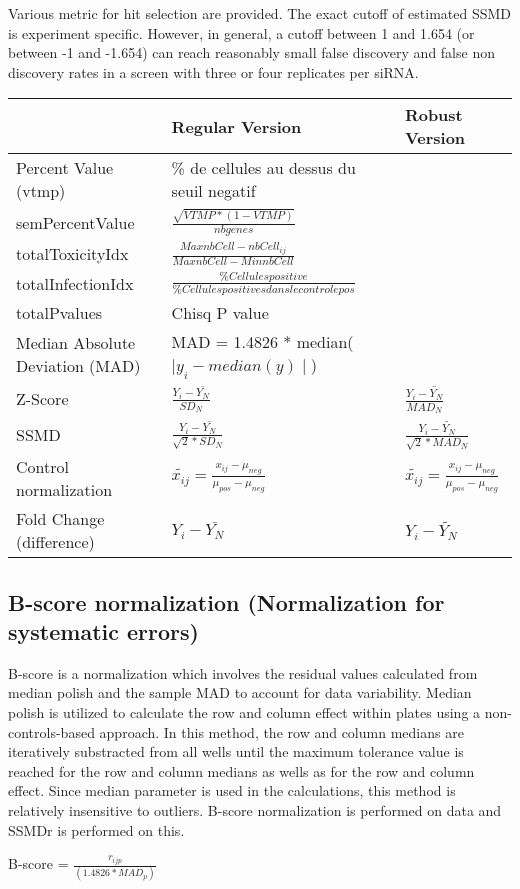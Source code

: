 \documentclass[a4paper,10pt]{article}
\begin{document}
Various metric for hit selection are provided. 
The exact cutoff of estimated SSMD is experiment specific. However, in general, a cutoff between 1 and 1.654 (or between -1 and -1.654)
can reach reasonably small false discovery and false non discovery rates in a screen with three or four replicates per siRNA.

\vspace{1cm}
\begin{tabular}{|l|l|l|}
\hline
     & Regular Version                             & Robust Version \\
\hline
Percent Value (vtmp) &  \% de cellules au dessus du seuil negatif & \\
semPercentValue & $\frac{\sqrt{VTMP*(1-VTMP)}}{nb genes}$  & \\
totalToxicityIdx & $\frac{Max nb Cell - nb Cell_{ij}}{Max nb Cell- Min nb Cell}$& \\
totalInfectionIdx & $\frac{\% Cellules positive}{\% Cellules positives dans le controle pos}$ & \\
totalPvalues & Chisq P value & \\
Median Absolute Deviation (MAD) & MAD = 1.4826 * median($\mid y_i - median(y)\mid$) & \\
Z-Score  &  $\frac{Y_i-\bar{Y_N}}{SD_N}$        & $\frac{Y_i-\tilde{Y_N}}{MAD_N}$ \\
SSMD     & $\frac{Y_i-\bar{Y_N}}{\sqrt{2}*SD_N}$   & $\frac{Y_i-\tilde{Y_N}}{\sqrt{2}*MAD_N}$ \\
Control normalization & $\tilde{x_{ij}}=\frac{x_{ij} - \mu_{neg}}{\mu_{pos} - \mu_{neg}}$ & $\tilde{x_{ij}}=\frac{x_{ij} - \mu_{neg}}{\mu_{pos} - \mu_{neg}}$ \\
Fold Change (difference) & $Y_i-\bar{Y_N}$ & $Y_i-\tilde{Y_N}$ \\
\hline
\end{tabular}

\bigskip

\subsection*{B-score normalization (Normalization for systematic errors)}

B-score is a normalization which involves the residual values calculated from median polish and the sample MAD to account for 
data variability. Median polish is utilized to calculate the row and column effect within plates using a non-controls-based approach.
In this method, the row and column medians are iteratively substracted from all wells until the maximum tolerance value is reached for the row
and column medians as wells as for the row and column effect. Since median parameter is used in the calculations, this method is relatively
insensitive to outliers.
B-score normalization is performed on data and SSMDr is performed on this.
\begin{center}
B-score = $\frac{r_{ijp}}{( 1.4826 * MAD_{p})}$
\end{center}
\end{document}
